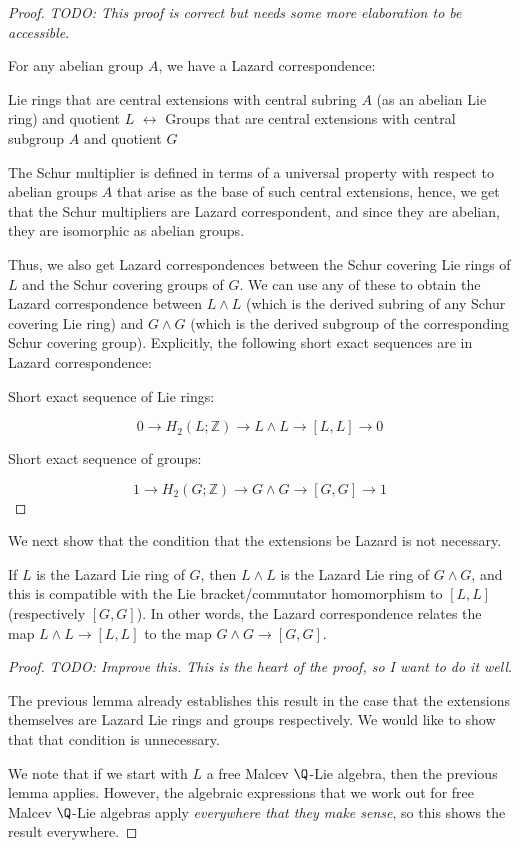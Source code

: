 \begin{proof}
  {\em TODO: This proof is correct but needs some more elaboration to
  be accessible}.

  For any abelian group $A$, we have a Lazard correspondence:

  Lie rings that are central extensions with central subring $A$ (as
  an abelian Lie ring) and quotient $L$ $\leftrightarrow$ Groups that
  are central extensions with central subgroup $A$ and quotient $G$

  The Schur multiplier is defined in terms of a universal property
  with respect to abelian groups $A$ that arise as the base of such
  central extensions, hence, we get that the Schur multipliers are
  Lazard correspondent, and since they are abelian, they are
  isomorphic as abelian groups.

  Thus, we also get Lazard correspondences between the Schur covering
  Lie rings of $L$ and the Schur covering groups of $G$. We can use
  any of these to obtain the Lazard correspondence between $L \wedge
  L$ (which is the derived subring of any Schur covering Lie ring) and
  $G \wedge G$ (which is the derived subgroup of the corresponding
  Schur covering group). Explicitly, the following short exact
  sequences are in Lazard correspondence:

  Short exact sequence of Lie rings:

  $$0 \to H_2(L;\mathbb{Z}) \to L \wedge L \to [L,L] \to 0$$

  Short exact sequence of groups:

  $$1 \to H_2(G;\mathbb{Z}) \to G \wedge G \to [G,G] \to 1$$
\end{proof}

We next show that the condition that the extensions be Lazard is not
necessary.

\begin{lemma}
  If $L$ is the Lazard Lie ring of $G$, then $L \wedge L$ is the
  Lazard Lie ring of $G \wedge G$, and this is compatible with the Lie
  bracket/commutator homomorphism to $[L,L]$ (respectively
  $[G,G]$). In other words, the Lazard correspondence relates the map
  $L \wedge L \to [L,L]$ to the map $G \wedge G \to [G,G]$.
\end{lemma}

\begin{proof}
  {\em TODO: Improve this. This is the heart of the
  proof, so I want to do it well}.

  The previous lemma already establishes this result in the case that
  the extensions themselves are Lazard Lie rings and groups
  respectively. We would like to show that that condition is
  unnecessary.

  We note that if we start with $L$ a free Malcev $\Q$-Lie algebra,
  then the previous lemma applies. However, the algebraic expressions
  that we work out for free Malcev $\Q$-Lie algebras apply {\em
  everywhere that they make sense}, so this shows the result
  everywhere.
\end{proof}

